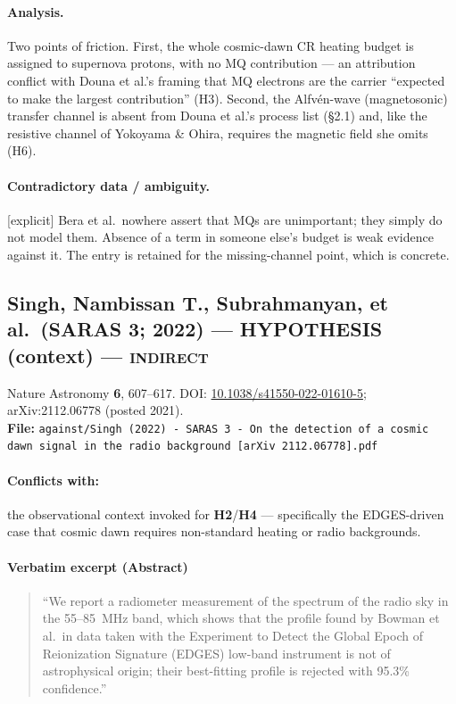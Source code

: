\documentclass[11pt,a4paper]{article}
\newcommand{\HYP}{\textcolor{blue!60!black}{\textbf{HYPOTHESIS}}}
\newcommand{\flag}[1]{\textcolor{orange!75!black}{\textsf{\small [#1]}}}
\begin{document}
\paragraph{Analysis.}
Two points of friction. First, the whole cosmic-dawn CR heating budget is
assigned to supernova protons, with no MQ contribution --- an attribution
conflict with Douna et al.'s framing that MQ electrons are the carrier ``expected
to make the largest contribution'' (H3). Second, the Alfv\'en-wave
(magnetosonic) transfer channel is absent from Douna et al.'s process list
(\S2.1) and, like the resistive channel of Yokoyama \& Ohira, requires the
magnetic field she omits (H6).

\paragraph{Contradictory data / ambiguity.} \flag{explicit}
Bera et al.\ nowhere assert that MQs are unimportant; they simply do not model
them. Absence of a term in someone else's budget is weak evidence against it.
The entry is retained for the missing-channel point, which is concrete.

\subsection{Singh, Nambissan T., Subrahmanyan, et al.\ (SARAS 3; 2022) --- \HYP{} (context) --- \textsc{indirect}}
\noindent Nature Astronomy \textbf{6}, 607--617. DOI:
\href{https://doi.org/10.1038/s41550-022-01610-5}{10.1038/s41550-022-01610-5};
arXiv:2112.06778 (posted 2021).\\
\textbf{File:} \texttt{against/Singh (2022) - SARAS 3 - On the detection of a cosmic dawn signal in the radio background [arXiv 2112.06778].pdf}

\paragraph{Conflicts with:} the observational context invoked for
\textbf{H2}/\textbf{H4} --- specifically the EDGES-driven case that cosmic dawn
requires non-standard heating or radio backgrounds.

\paragraph{Verbatim excerpt (Abstract)}
\begin{quote}\small
``We report a radiometer measurement of the spectrum of the radio sky in the
55--85~MHz band, which shows that the profile found by Bowman et al.\ in data
taken with the Experiment to Detect the Global Epoch of Reionization Signature
(EDGES) low-band instrument is not of astrophysical origin; their best-fitting
profile is rejected with 95.3\% confidence.''
\end{quote}
\end{document}
